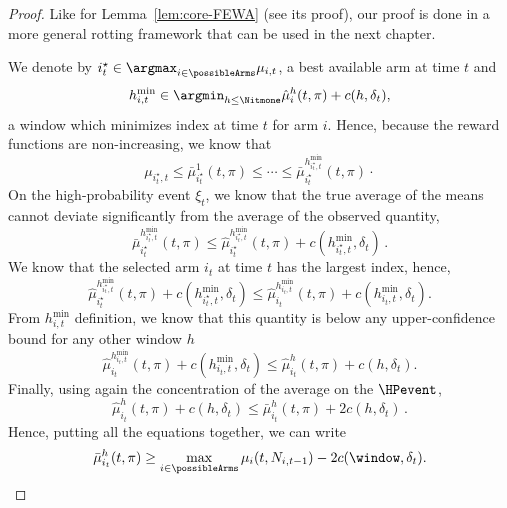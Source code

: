 \begin{proof}
Like for Lemma~\ref{lem:core-FEWA} (see its proof), our proof is done in a more general rotting framework that can be used in the next chapter. 

We denote by $
i^\star_t \in \argmax_{i\in \possibleArms}{\mu_{i,t}}
$, a best available arm at time $t$ and 
\[
h_{i,t}^{\min} \in \argmin_{h\leq \Nitmone }{\hat{\mu}_i^h(t,\pi) + c(h,\delta_t)},
\]
a window which minimizes \RAWUCB index at time $t$ for arm $i$. Hence, because the reward functions are non-increasing, we know that 
\begin{equation*}
 \mu_{i^\star_t, t } \leq   \bar{\mu}_{i^\star_t}^1(t,\pi) \leq \cdots \leq  \bar{\mu}_{i^\star_t}^{h_{i^\star_t,t}^{\min}}(t,\pi)\cdot
\end{equation*}
On the high-probability event $\xi_t$, we know that the true average of the means cannot deviate significantly from the average of the observed quantity,
\begin{equation*}
\bar{\mu}_{i^\star_t}^{h_{i^\star_t,t}^{\min}}(t, \pi) \leq \hat{\mu}_{i^\star_t}^{h_{i^\star_t,t}^{\min}}(t,\pi) + c(h_{i^\star_t,t}^{\min},\delta_t)\,.
\end{equation*}
We know that the selected arm $i_t$ at time $t$ has the largest index, hence, 
\[
\hat{\mu}_{i^\star_t}^{h^{\min}_{i^\star_t,t}}(t, \pi) + c(h^{\min}_{i^\star_t,t},\delta_t) \leq \hat{\mu}_{i_t}^{h^{\min}_{i_t,t}}(t, \pi) + c(h^{\min}_{i_t,t},\delta_t).
\]
From $h_{i,t}^{\min}$ definition, we know that this quantity is below any upper-confidence bound for any other window $h$
\[
\hat{\mu}_{i_t}^{h^{\min}_{i_t,t}}(t, \pi) + c(h^{\min}_{i_t,t},\delta_t) \leq \hat{\mu}_{i_t}^{h}(t, \pi) + c(h,\delta_t).
\]
Finally, using again the concentration of the average on the $\HPevent$, 
\[
\hat{\mu}_{i_t}^{h}(t, \pi) + c(h,\delta_t) \leq \bar{\mu}_{i_t}^{h}(t, \pi) + 2c(h,\delta_t)\,.
\]
Hence, putting all the equations together, we can write
\begin{equation*}
\bar{\mu}_{i_t}^{h}(t, \pi) \geq \max_{i \in \possibleArms} \mu_{i}(t,N_{i,t-1}) - 2 c(\window, \delta_t).
\end{equation*}
\end{proof}